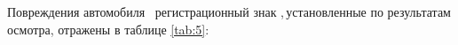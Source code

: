 \indent Повреждения автомобиля \, регистрационный знак ,\,установленные по результатам осмотра, отражены в таблице \ref{tab:5}: 

